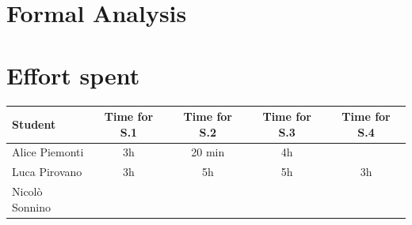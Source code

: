 \documentclass[table, 12pt]{article}
\begin{document}
\section{Formal Analysis}
\newpage
\section{Effort spent}
\begin{tabular}{ | l || c | c | c | c |}
    \hline
    Student        & Time for S.1 & Time for S.2 & Time for S.3 & Time for S.4 \\ \hline
    Alice Piemonti & 3h           & 20 min       & 4h           &              \\ \hline
    Luca Pirovano  & 3h           & 5h           & 5h           & 3h           \\ \hline
    Nicolò Sonnino &              &              &              &              \\
    \hline
\end{tabular}
\end{document}
